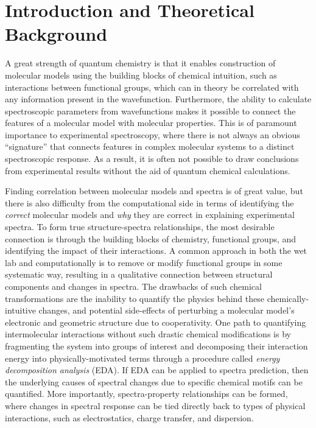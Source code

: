 \documentclass[%
class = book,%
crop = false,%
float = true,%
multi = true,%
preview = false,%
]{standalone}
\begin{document}
\onlyifstandalone{\tableofcontents}
\chapter{Introduction and Theoretical Background}
\label{ch:introduction}
\newcommand{\ks}{Kohn\textendash{}Sham}

A great strength of quantum chemistry is that it enables construction of molecular models using the building blocks of chemical intuition, such as interactions between functional groups, which can in theory be correlated with any information present in the wavefunction. Furthermore, the ability to calculate spectroscopic parameters from wavefunctions makes it possible to connect the features of a molecular model with molecular properties. This is of paramount importance to experimental spectroscopy, where there is not always an obvious ``signature'' that connects features in complex molecular systems to a distinct spectroscopic response. As a result, it is often not possible to draw conclusions from experimental results without the aid of quantum chemical calculations.

Finding correlation between molecular models and spectra is of great value, but there is also difficulty from the computational side in terms of identifying the \emph{correct} molecular models and \emph{why} they are correct in explaining experimental spectra. To form true structure-spectra relationships, the most desirable connection is through the building blocks of chemistry, functional groups, and identifying the impact of their interactions. A common approach in both the wet lab and computationally is to remove or modify functional groups in some systematic way, resulting in a qualitative connection between structural components and changes in spectra. The drawbacks of such chemical transformations are the inability to quantify the physics behind these chemically-intuitive changes, and potential side-effects of perturbing a molecular model's electronic and geometric structure due to cooperativity. One path to quantifying intermolecular interactions without such drastic chemical modifications is by fragmenting the system into groups of interest and decomposing their interaction energy into physically-motivated terms through a procedure called \emph{energy decomposition analysis} (EDA). If EDA can be applied to spectra prediction, then the underlying causes of spectral changes due to specific chemical motifs can be quantified. More importantly, spectra-property relationships can be formed, where changes in spectral response can be tied directly back to types of physical interactions, such as electrostatics, charge transfer, and dispersion.
\end{document}
